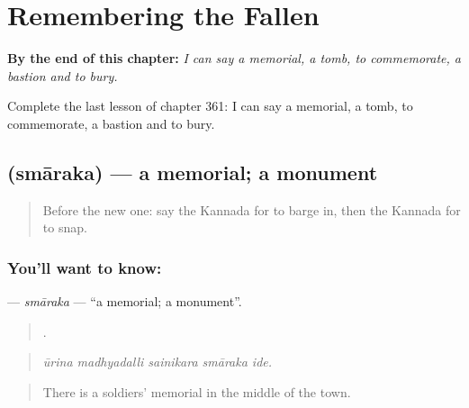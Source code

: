 
\chapter{Remembering the Fallen}
\label{ch:ka-remembering-the-fallen}

\begin{chapteropening}
\textbf{By the end of this chapter:} \emph{I can say a memorial, a tomb, to commemorate, a bastion and to bury.}

Complete the last lesson of chapter 361: I can say a memorial, a tomb, to commemorate, a bastion and to bury.
\end{chapteropening}

\section[\texorpdfstring{\kn{ಸ್ಮಾರಕ} (smāraka)}{ಸ್ಮಾರಕ (smāraka)}]{ (smāraka) — a memorial; a monument}

\label{lesson:KA-C361-smaraka}



\begin{quote}
Before the new one: say the Kannada for to barge in, then the Kannada for to snap.
\end{quote}

\subsection*{You'll want to know: }
\textbf{} — \emph{smāraka} — \textquotedblleft{}a memorial; a monument\textquotedblright{}.

\begin{quote}
    .
\end{quote}

\begin{quote}
\emph{ūrina madhyadalli sainikara smāraka ide.}
\end{quote}

\begin{quote}
There is a soldiers' memorial in the middle of the town.
\end{quote}

